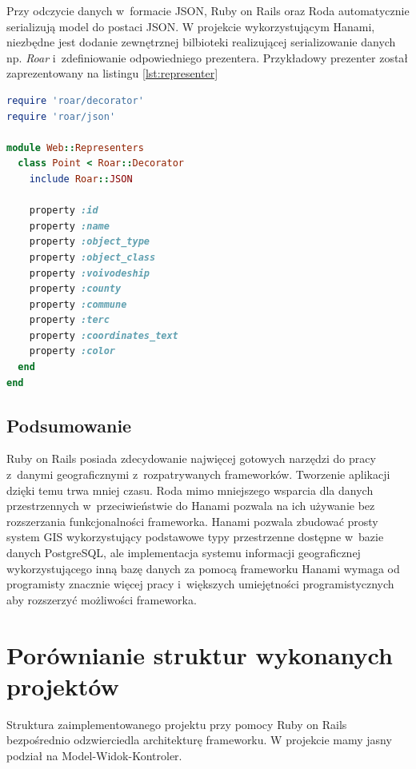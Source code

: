 \documentclass[printmode]{mgr}
\begin{document}
Przy odczycie danych w~formacie JSON, Ruby on Rails oraz Roda automatycznie serializują model do postaci JSON. W projekcie wykorzystującym Hanami, niezbędne jest dodanie zewnętrznej bilbioteki realizującej serializowanie danych np. \textit{Roar} i~zdefiniowanie odpowiedniego prezentera. Przykładowy prezenter został zaprezentowany na listingu \ref{lst:representer}

 \begin{lstlisting}[language=Ruby, caption={Prezenter dla modelu Point}, label=lst:representer]
require 'roar/decorator'
require 'roar/json'

module Web::Representers
  class Point < Roar::Decorator
    include Roar::JSON

    property :id
    property :name
    property :object_type
    property :object_class
    property :voivodeship
    property :county
    property :commune
    property :terc
    property :coordinates_text
    property :color
  end
end
\end{lstlisting}

\subsection{Podsumowanie}

Ruby on Rails posiada zdecydowanie najwięcej gotowych narzędzi do pracy z~danymi geograficznymi z~rozpatrywanych frameworków. Tworzenie aplikacji dzięki temu trwa mniej czasu. Roda mimo mniejszego wsparcia dla danych przestrzennych w~przeciwieństwie do Hanami pozwala na ich używanie bez rozszerzania funkcjonalności frameworka. Hanami pozwala zbudować prosty system GIS wykorzystujący podstawowe typy przestrzenne dostępne w~bazie danych PostgreSQL, ale implementacja systemu informacji geograficznej wykorzystującego inną bazę danych za pomocą frameworku Hanami wymaga od programisty znacznie więcej pracy i~większych umiejętności programistycznych aby rozszerzyć możliwości frameworka.

\newpage

\section{Porównianie struktur wykonanych projektów}

Struktura zaimplementowanego projektu przy pomocy Ruby on Rails bezpośrednio odzwierciedla architekturę frameworku. W projekcie mamy jasny podział na Model-Widok-Kontroler. 
\end{document}
